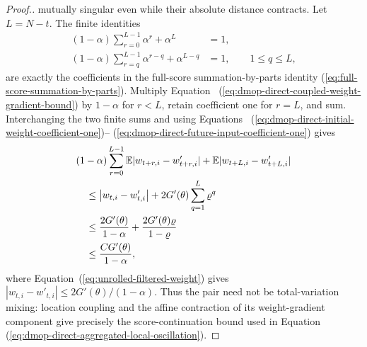 \documentclass[11pt]{article}
\theoremstyle{thmstylethree}%
\begin{document}
\begin{proof}[Proof.]
mutually singular even while their absolute distance contracts.
Let $L=N-t$.  The finite identities
\begin{align}
(1-\alpha)\sum_{r=0}^{L-1}\alpha^r+\alpha^L&=1,
\label{eq:dmop-direct-initial-weight-coefficient-one}
\\
(1-\alpha)\sum_{r=q}^{L-1}\alpha^{r-q}
+\alpha^{L-q}&=1,
\qquad 1\leq q\leq L,
\label{eq:dmop-direct-future-input-coefficient-one}
\end{align}
are exactly the coefficients in the full-score summation-by-parts identity
(\ref{eq:full-score-summation-by-parts}).  Multiply Equation~
(\ref{eq:dmop-direct-coupled-weight-gradient-bound}) by $1-\alpha$ for
$r<L$, retain coefficient one for $r=L$, and sum.  Interchanging the two
finite sums and using Equations~
(\ref{eq:dmop-direct-initial-weight-coefficient-one})--
(\ref{eq:dmop-direct-future-input-coefficient-one}) gives
\begin{align}
&(1-\alpha)\sum_{r=0}^{L-1}
\mathbb{E}|w_{t+r,i}-w'_{t+r,i}|
+\mathbb{E}|w_{t+L,i}-w'_{t+L,i}|                                \notag\\
&\quad\leq
\left|w_{t,i}-w'_{t,i}\right|
+2G'(\theta)\sum_{q=1}^{L}\varrho^q                      \notag\\
&\quad\leq
\frac{2G'(\theta)}{1-\alpha}
+\frac{2G'(\theta)\varrho}{1-\varrho}                   \notag\\
&\quad\leq
\frac{CG'(\theta)}{1-\alpha},
\label{eq:dmop-direct-pair-full-score-continuation-bound}
\end{align}
where Equation~(\ref{eq:unrolled-filtered-weight}) gives
$|w_{t,i}-w'_{t,i}|\leq2G'(\theta)/(1-\alpha)$.
Thus the pair need not be total-variation mixing: location coupling and
the affine contraction of its weight-gradient component give precisely
the score-continuation bound used in Equation~
(\ref{eq:dmop-direct-aggregated-local-oscillation}).


\end{proof}
\end{document}
